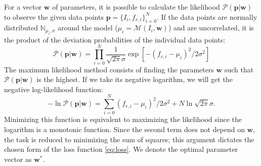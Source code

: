 \documentclass[%
 aip,
 draft,
 amsmath,amssymb,
 reprint,%
]{revtex4-1}
\begin{document}
For a vector $\mathbf{w}$ of parameters, it is possible to calculate the likelihood $ \mathcal{P}(\mathbf{p}|\mathbf{w}) $ to observe the given data points $\mathbf{p} = \{I_i, f_{r,i}\}_{i=0}^N$. If the data points are normally distributed $\mathbb{N}_{\mu_i, \sigma}$ around the model ($\mu_i = \mathcal{M}(I_i, \mathbf{w})$) and are uncorrelated, it is the product of the deviation probabilities of the individual data points:
\begin{equation}
\mathcal{P}(\mathbf{p}|\mathbf{w}) = \prod_{i=0}^{N} \frac{1}{\sqrt{2\pi}\sigma} \exp[ -(f_{r,i} - \mu_i)^2 / 2 \sigma^2]\label{eq:MLE} 
\end{equation}
The maximum likelihood method consists of finding the parameters $\mathbf{w}$ such that $ \mathcal{P}(\mathbf{p}|\mathbf{w}) $ is the highest. If we take its negative logarithm, we will get the negative log-likelihood function:
\begin{equation}
- \ln \mathcal{P}(\mathbf{p}|\mathbf{w}) = \sum_{i=0}^N (f_{r,i} - \mu_i)^2 / 2 \sigma^2 + N \ln\sqrt{2\pi}\sigma.
\label{eq:logL}
\end{equation}
Minimizing this function is equivalent to maximizing the likelihood since the logarithm is a monotonic function. Since the second term does not depend on $\mathbf{w}$, the task is reduced to minimizing the sum of squares; this argument dictates the chosen form of the loss function \eqref{eq:loss}. We denote the optimal parameter vector as $\mathbf{w}^*$.
\end{document}
